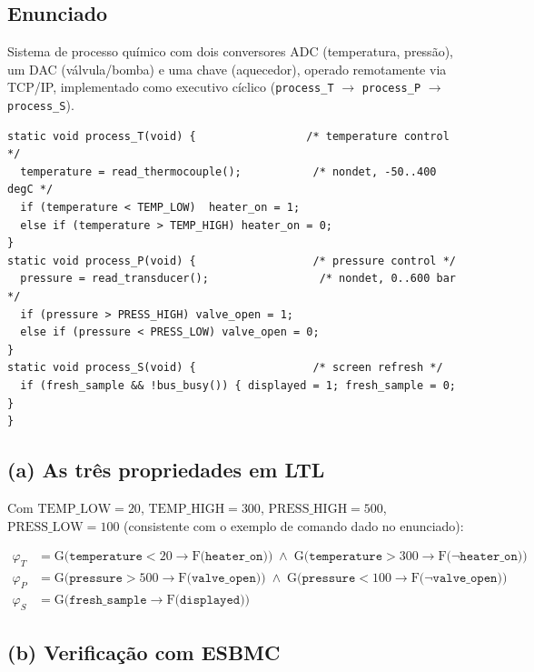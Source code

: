 \documentclass[12pt,a4paper]{article}
\newcommand{\LG}[1]{\mathrm{G}\bigl(#1\bigr)}
\newcommand{\LF}[1]{\mathrm{F}\bigl(#1\bigr)}
\newcommand{\vv}[1]{\texttt{#1}}
\begin{document}
\subsection*{Enunciado}
Sistema de processo qu\'imico com dois conversores ADC (temperatura, press\~ao), um DAC
(v\'alvula/bomba) e uma chave (aquecedor), operado remotamente via TCP/IP, implementado
como executivo c\'iclico (\vv{process\_T} $\to$ \vv{process\_P} $\to$ \vv{process\_S}).

\begin{lstlisting}[style=cstyle,caption={exercises/ecps/plant.c -- abridged}]
static void process_T(void) {                 /* temperature control */
  temperature = read_thermocouple();           /* nondet, -50..400 degC */
  if (temperature < TEMP_LOW)  heater_on = 1;
  else if (temperature > TEMP_HIGH) heater_on = 0;
}
static void process_P(void) {                  /* pressure control */
  pressure = read_transducer();                 /* nondet, 0..600 bar */
  if (pressure > PRESS_HIGH) valve_open = 1;
  else if (pressure < PRESS_LOW) valve_open = 0;
}
static void process_S(void) {                  /* screen refresh */
  if (fresh_sample && !bus_busy()) { displayed = 1; fresh_sample = 0; }
}
\end{lstlisting}

\subsection{(a) As tr\^es propriedades em LTL}

Com $\mathrm{TEMP\_LOW}=20$, $\mathrm{TEMP\_HIGH}=300$, $\mathrm{PRESS\_HIGH}=500$,
$\mathrm{PRESS\_LOW}=100$ (consistente com o exemplo de comando dado no enunciado):

\begin{align*}
  \varphi_T &= \LG{\vv{temperature} < 20 \rightarrow \LF{\vv{heater\_on}}} \;\wedge\;
               \LG{\vv{temperature} > 300 \rightarrow \LF{\neg\vv{heater\_on}}} \\[6pt]
  \varphi_P &= \LG{\vv{pressure} > 500 \rightarrow \LF{\vv{valve\_open}}} \;\wedge\;
               \LG{\vv{pressure} < 100 \rightarrow \LF{\neg\vv{valve\_open}}} \\[6pt]
  \varphi_S &= \LG{\vv{fresh\_sample} \rightarrow \LF{\vv{displayed}}}
\end{align*}

\subsection{(b) Verifica\c{c}\~ao com ESBMC}
\end{document}
